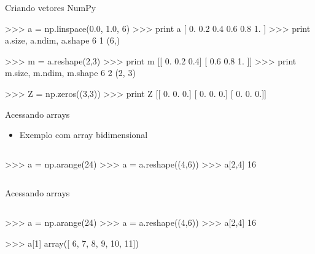 \documentclass[12pt,t,graphics]{beamer}
\begin{document}

\begin{frame}[t,fragile]{Criando vetores NumPy}
\begin{python}
>>> a = np.linspace(0.0, 1.0, 6)
>>> print a
[ 0.   0.2  0.4  0.6  0.8  1. ]
>>> print a.size, a.ndim, a.shape    
6 1 (6,)
	
>>> m = a.reshape(2,3)
>>> print m
[[ 0.   0.2  0.4]
[ 0.6  0.8  1. ]]
>>> print m.size, m.ndim, m.shape
6 2 (2, 3)
	
>>> Z = np.zeros((3,3))
>>> print Z
[[ 0.  0.  0.]
[ 0.  0.  0.]
[ 0.  0.  0.]]
\end{python}
\end{frame}

\begin{frame}[t,fragile]{Acessando arrays}
	\begin{itemize}
		\item Exemplo com array bidimensional
	\end{itemize}
	\begin{columns}
		\begin{python}
		>>> a = np.arange(24)
		>>> a = a.reshape((4,6))
		>>> a[2,4]
		16
		\end{python}
		
	\end{columns}
\end{frame}

\begin{frame}[t,fragile]{Acessando arrays}
	\begin{columns}
		\column{.5\textwidth}
		\begin{python}
		>>> a = np.arange(24)
		>>> a = a.reshape((4,6))
		>>> a[2,4]
		16
		
		>>> a[1]
		array([ 6,  7,  8,  9, 10, 11])
		\end{python}
	\end{columns}
\end{frame}
\end{document}
